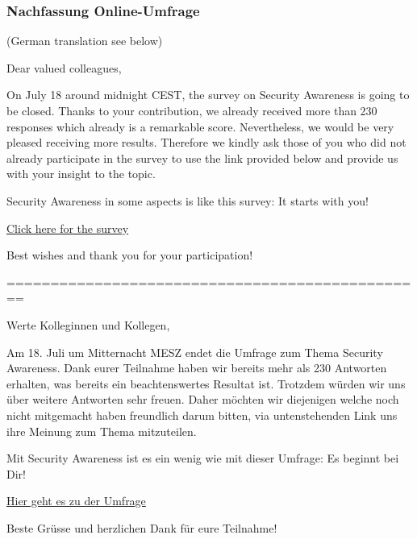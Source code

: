 \documentclass[../../main.tex]{subfiles}
\begin{document}
\newpage

\subsubsection*{Nachfassung Online-Umfrage}
\label{nachfassung_online_umfrage}

\begin{sloppypar}

{\selectfont
\footnotesize

(German translation see below)

Dear valued colleagues,

On July 18 around midnight CEST, the survey on Security Awareness is going to be closed. Thanks to your contribution, we already received more than 230 responses which already is a remarkable score. Nevertheless, we would be very pleased receiving more results. Therefore we kindly ask those of you who did not already participate in the survey to use the link provided below and provide us with your insight to the topic. 

Security Awareness in some aspects is like this survey: It starts with you!

\underline{Click here for the survey}

Best wishes and thank you for your participation!                                                                                                               

================================================

Werte Kolleginnen und Kollegen,

Am 18. Juli um Mitternacht MESZ endet die Umfrage zum Thema Security Awareness. Dank eurer Teilnahme haben wir bereits mehr als 230 Antworten erhalten, was bereits ein beachtenswertes Resultat ist. Trotzdem würden wir uns über weitere Antworten sehr freuen. Daher möchten wir diejenigen welche noch nicht mitgemacht haben freundlich darum bitten, via untenstehenden Link uns ihre Meinung zum Thema mitzuteilen. 

Mit Security Awareness ist es ein wenig wie mit dieser Umfrage: Es beginnt bei Dir!

\underline{Hier geht es zu der Umfrage}

Beste Grüsse und herzlichen Dank für eure Teilnahme!

}
\normalsize
\end{sloppypar}
\end{document}
